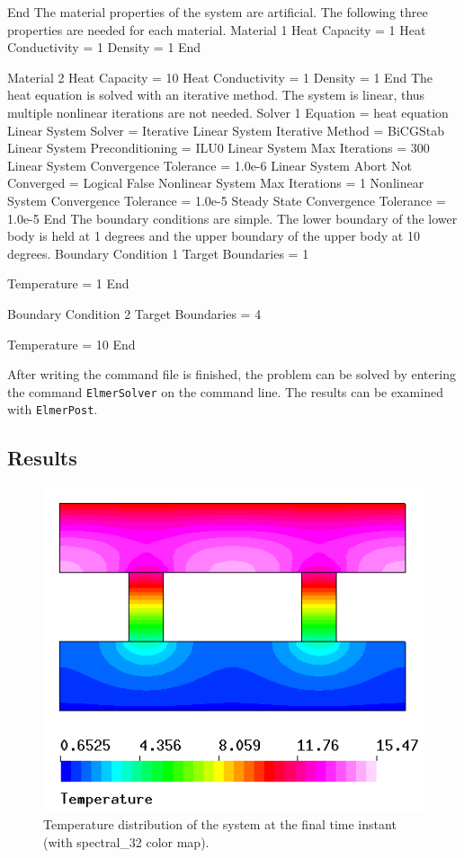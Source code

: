 End
\ttend
%
The material properties of the system are artificial. The following
three properties are needed for each material.
%
\ttbegin
Material 1
  Heat Capacity = 1
  Heat Conductivity = 1
  Density = 1
End

Material 2
  Heat Capacity = 10
  Heat Conductivity = 1
  Density = 1
End
\ttend
%
The heat equation is solved with an iterative method. The system is
linear, thus multiple nonlinear iterations are not needed.
%
\ttbegin
Solver 1
  Equation = heat equation
  Linear System Solver = Iterative
  Linear System Iterative Method = BiCGStab
  Linear System Preconditioning = ILU0
  Linear System Max Iterations = 300
  Linear System Convergence Tolerance = 1.0e-6
  Linear System Abort Not Converged = Logical False
  Nonlinear System Max Iterations = 1
  Nonlinear System Convergence Tolerance = 1.0e-5
  Steady State Convergence Tolerance = 1.0e-5
End
\ttend
%
The boundary conditions are simple. The lower boundary of the lower
body is held at 1 degrees and the upper boundary of the upper body at
10 degrees.
%
\ttbegin
Boundary Condition 1
  Target Boundaries = 1

  Temperature = 1
End

Boundary Condition 2
  Target Boundaries = 4

  Temperature = 10
End
\ttend

After writing the command file is finished, the problem can be solved
by entering the command \texttt{ElmerSolver} on the command line. The
results can be examined with \texttt{ElmerPost}.


\subsection*{Results}

\begin{figure}
\begin{center}
  \includegraphics[height=0.5\textwidth]{heat.png}
\end{center}
\caption{Temperature distribution of the system at the final time
  instant (with spectral\_32 color map).}
\label{fig:temp_passive}
\end{figure}
 

